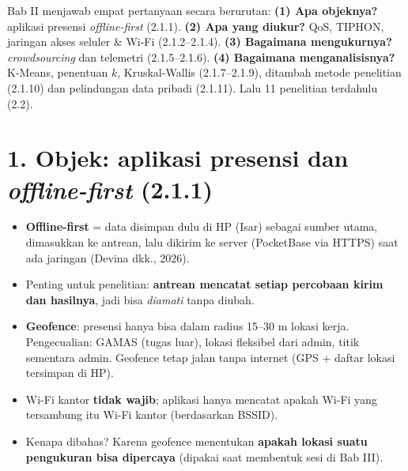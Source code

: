 


\begin{intinya}
Bab II menjawab empat pertanyaan secara berurutan:
\textbf{(1) Apa objeknya?} aplikasi presensi \textit{offline-first} (2.1.1).
\textbf{(2) Apa yang diukur?} QoS, TIPHON, jaringan akses seluler \& Wi-Fi (2.1.2--2.1.4).
\textbf{(3) Bagaimana mengukurnya?} \textit{crowdsourcing} dan telemetri (2.1.5--2.1.6).
\textbf{(4) Bagaimana menganalisisnya?} K-Means, penentuan $k$, Kruskal-Wallis (2.1.7--2.1.9),
ditambah metode penelitian (2.1.10) dan pelindungan data pribadi (2.1.11). Lalu 11 penelitian terdahulu (2.2).
\end{intinya}

\section*{1. Objek: aplikasi presensi dan \textit{offline-first} (2.1.1)}
\begin{itemize}
  \item \textbf{Offline-first} = data disimpan dulu di HP (Isar) sebagai sumber utama, dimasukkan ke antrean, lalu dikirim ke server (PocketBase via HTTPS) saat ada jaringan (Devina dkk., 2026).
  \item Penting untuk penelitian: \textbf{antrean mencatat setiap percobaan kirim dan hasilnya}, jadi bisa \textit{diamati} tanpa diubah.
  \item \textbf{Geofence}: presensi hanya bisa dalam radius 15--30 m lokasi kerja. Pengecualian: GAMAS (tugas luar), lokasi fleksibel dari admin, titik sementara admin. Geofence tetap jalan tanpa internet (GPS + daftar lokasi tersimpan di HP).
  \item Wi-Fi kantor \textbf{tidak wajib}; aplikasi hanya mencatat apakah Wi-Fi yang tersambung itu Wi-Fi kantor (berdasarkan BSSID).
  \item Kenapa dibahas? Karena geofence menentukan \textbf{apakah lokasi suatu pengukuran bisa dipercaya} (dipakai saat membentuk sesi di Bab III).
\end{itemize}

